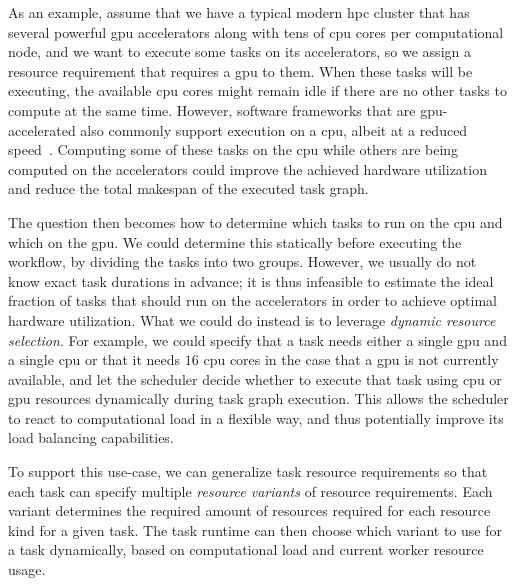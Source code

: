 As an example, assume that we have a typical modern \gls{hpc} cluster that has
several powerful \gls{gpu} accelerators along with tens of \gls{cpu}
cores per computational node, and we want to execute some tasks on its accelerators, so we assign a
resource requirement that requires a \gls{gpu} to them. When these tasks will be
executing, the available \gls{cpu} cores might remain idle if there are no other
tasks to compute at the same time. However, software frameworks that are
\gls{gpu}-accelerated also commonly support execution on a \gls{cpu},
albeit at a reduced speed~\cite{gromacs,tensorflow}. Computing some of these tasks on the
\gls{cpu} while others are being computed on the accelerators could improve the
achieved hardware utilization and reduce the total makespan of the executed task graph.

The question then becomes how to determine which tasks to run on the \gls{cpu} and
which on the \gls{gpu}. We could determine this statically before executing the
workflow, by dividing the tasks into two groups. However, we usually do not know exact task
durations in advance; it is thus infeasible to estimate the ideal fraction of tasks that should run
on the accelerators in order to achieve optimal hardware utilization. What we could do instead is
to leverage \emph{dynamic resource selection}. For example, we could specify that a task needs either a
single \gls{gpu} and a single \gls{cpu} or that it needs
$16$ \gls{cpu} cores in the case that a \gls{gpu} is
not currently available, and let the scheduler decide whether to execute that task using
\gls{cpu} or \gls{gpu} resources dynamically during task graph
execution. This allows the scheduler to react to computational load in a flexible way, and thus
potentially improve its load balancing capabilities.

To support this use-case, we can generalize task resource requirements so that each task can
specify multiple \emph{resource variants} of resource requirements. Each variant determines the
required amount of resources required for each resource kind for a given task. The task runtime can
then choose which variant to use for a task dynamically, based on computational load and current
worker resource usage.

